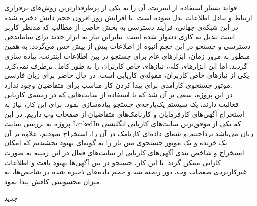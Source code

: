 

\pagestyle{empty}

\begin{center}
\end{center}
فواید بسیار استفاده از اینترنت، آن را به یکی از پرطرفدارترین روش‌های برقراری ارتباط و تبادل اطلاعات بدل نموده است. با افزایش روز افزون حجم دانش ذخیره شده در این شبکه‌ی جهانی، فرآیند دسترسی به بخش خاصی از مطالب که مدنظر کاربر است تبدیل به کاری دشوار شده است. بنابراین نیاز به ابزار جدید برای ساماندهی دسترسی و جستجو در این حجم انبوه از اطلاعات بیش از پیش حس می‌گردد. به همین منظور به مرور زمان، ابزارهای عام برای جستجو در بین اطلاعات اینترنت، پیاده-سازی گردید. اما این ابزارهای کلی، نیازهای خاص کاربران را به طور کامل برطرف نمی‌کرد. یکی از نیازهای خاص کاربران، مقوله‌ی کاریابی است. در حال حاضر برای زبان فارسی موتور جستجوی کارامدی برای پیدا کردن کار مناسب برای متقاضیان وجود ندارد.
\\
در این پروژه، سعی بر آن شد که با استفاده از سایت‌هایی که در زمینه‌ی کاریابی فعالیت دارند، یک سیستم یک‌پارچه‌ی جستجو پیاده‌سازی نمود. برای این کار، نیاز به استخراج آگهی‌های کارفرمایان و کارنامک‌های متقاضیان از صفحات وب داریم. در این پروژه به بررسی سایت LinkedIn که یکی از موفق‌ترین سایت‌های کاریابی انگلیسی زبان می‌باشد پرداختیم و شمای داده‌ای کارنامک در آن را، استخراج نمودیم، علاوه بر آن یک خزنده و یک موتور جستجوی متن باز را به گونه‌ای بهبود بخشیدیم که امکان استخراج و شاخص بندی آگهی‌های کاریابی از سایت‌های فعال در این زمینه به صورت کارایی ممکن گردد. با این کار، جستجو در بین آگهی‌ها بهبود یافت و اطلاعات غیرکاربردی صفحات وب، دور ریخته شد و حجم داده‌های ذخیره شده در شاخص‌ها، به میزان محسوسی کاهش پیدا نمود.


‌جدید
